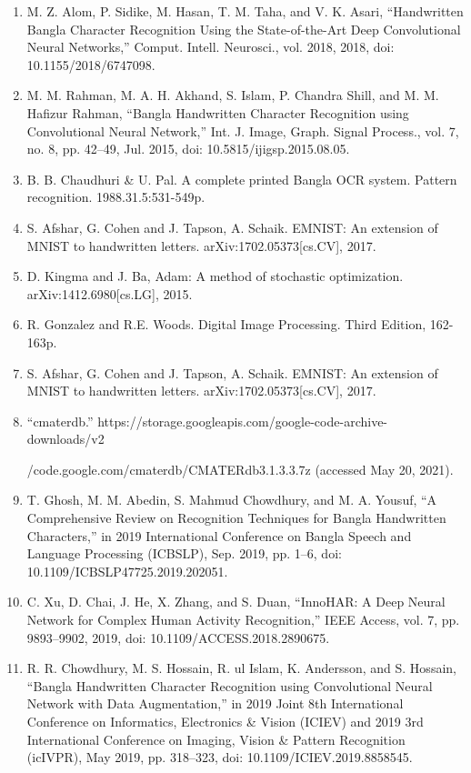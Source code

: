 \documentclass{article}
\begin{document}
\begin{enumerate}
\item M. Z. Alom, P. Sidike, M. Hasan, T. M. Taha, and V. K. Asari, “Handwritten Bangla Character Recognition Using the State-of-the-Art Deep Convolutional Neural Networks,” Comput. Intell. Neurosci., vol. 2018, 2018, doi: 10.1155/2018/6747098.
\item M. M. Rahman, M. A. H. Akhand, S. Islam, P. Chandra Shill, and M. M. Hafizur Rahman, “Bangla Handwritten Character Recognition using Convolutional Neural Network,” Int. J. Image, Graph. Signal Process., vol. 7, no. 8, pp. 42–49, Jul. 2015, doi: 10.5815/ijigsp.2015.08.05.
\item B. B. Chaudhuri & U. Pal. A complete printed Bangla OCR system. Pattern recognition.    1988.31.5:531-549p.
\item S. Afshar, G. Cohen and J. Tapson, A. Schaik. EMNIST: An extension of MNIST to  handwritten letters. arXiv:1702.05373[cs.CV], 2017.
\item D. Kingma and J. Ba, Adam: A method of stochastic optimization. arXiv:1412.6980[cs.LG], 2015.
\item R. Gonzalez and R.E. Woods. Digital Image Processing. Third Edition, 162-163p.
\item S. Afshar, G. Cohen and J. Tapson, A. Schaik. EMNIST: An extension of MNIST to handwritten letters. arXiv:1702.05373[cs.CV], 2017.
\item “cmaterdb.” 
https://storage.googleapis.com/google-code-archive-downloads/v2

/code.google.com/cmaterdb/CMATERdb3.1.3.3.7z (accessed May 20, 2021).
\item T. Ghosh, M. M. Abedin, S. Mahmud Chowdhury, and M. A. Yousuf, “A Comprehensive Review on Recognition Techniques for Bangla Handwritten Characters,” in 2019 International Conference on Bangla Speech and Language Processing (ICBSLP), Sep. 2019, pp. 1–6, doi: 10.1109/ICBSLP47725.2019.202051.
\item C. Xu, D. Chai, J. He, X. Zhang, and S. Duan, “InnoHAR: A Deep Neural Network for Complex Human Activity Recognition,” IEEE Access, vol. 7, pp. 9893–9902, 2019, doi: 10.1109/ACCESS.2018.2890675.
\item R. R. Chowdhury, M. S. Hossain, R. ul Islam, K. Andersson, and S. Hossain, “Bangla Handwritten Character Recognition using Convolutional Neural Network with Data Augmentation,” in 2019 Joint 8th International Conference on Informatics, Electronics & Vision (ICIEV) and 2019 3rd International Conference on Imaging, Vision & Pattern Recognition (icIVPR), May 2019, pp. 318–323, doi: 10.1109/ICIEV.2019.8858545.


\end{enumerate}
\end{document}
